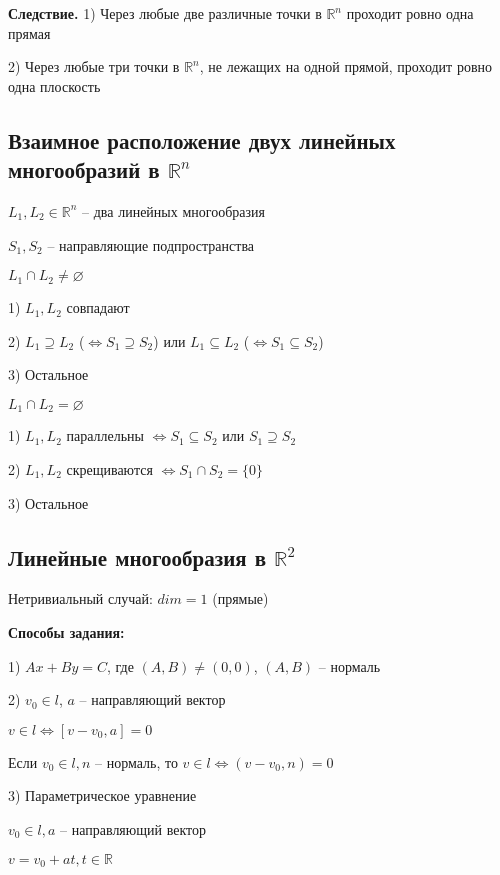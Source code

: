 \vspace{\baselineskip}
\textbf{Следствие.} 1) Через любые две различные точки в $\mathbb{R}^n$ проходит ровно одна прямая

2) Через любые три точки в $\mathbb{R}^n$, не лежащих на одной прямой, проходит ровно одна плоскость

\subsection{Взаимное расположение двух линейных многообразий в $\mathbb{R}^n$}

$L_1, L_2 \in \mathbb{R}^n$ -- два линейных многообразия

$S_1, S_2$ -- направляющие подпространства

\vspace{\baselineskip}
$L_1 \cap L_2 \neq \varnothing$

1) $L_1, L_2$ совпадают

2) $L_1 \supseteq L_2$ ($\Leftrightarrow S_1 \supseteq S_2$) или $L_1 \subseteq L_2$ ($\Leftrightarrow S_1 \subseteq S_2$)

3) Остальное

\vspace{\baselineskip}
$L_1 \cap L_2 = \varnothing$

1) $L_1, L_2$ параллельны $\Leftrightarrow S_1 \subseteq S_2$ или $S_1 \supseteq S_2$

2) $L_1, L_2$ скрещиваются $\Leftrightarrow S_1 \cap S_2 = \{0\}$

3) Остальное

\subsection{Линейные многообразия в $\mathbb{R}^2$}

Нетривиальный случай: $dim = 1$ (прямые)

\textbf{Способы задания:}

1) $Ax + By = C$, где $(A, B) \neq (0, 0)$, $(A, B)$ -- нормаль

2) $v_0 \in l$, $a$ -- направляющий вектор

$v \in l \Leftrightarrow [v - v_0, a] = 0$

Если $v_0 \in l, n$ -- нормаль, то $v \in l \Leftrightarrow (v - v_0, n) = 0$

3) Параметрическое уравнение

$v_0 \in l, a$ -- направляющий вектор

$v = v_0 + at, t \in \mathbb{R}$

